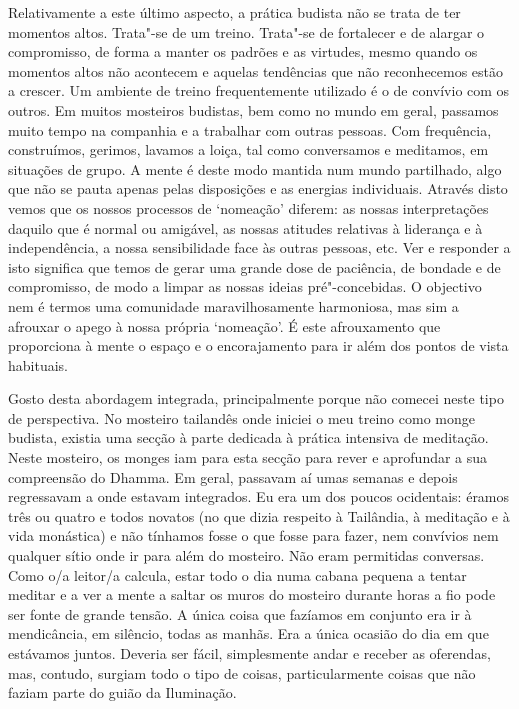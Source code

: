 Relativamente a este último aspecto, a prática budista não se trata de ter
momentos altos. Trata"-se de um treino. Trata"-se de fortalecer e de alargar o
compromisso, de forma a manter os padrões e as virtudes, mesmo quando os
momentos altos não acontecem e aquelas tendências que não reconhecemos estão a
crescer. Um ambiente de treino frequentemente utilizado é o de convívio com os
outros. Em muitos mosteiros budistas, bem como no mundo em geral, passamos muito
tempo na companhia e a trabalhar com outras pessoas. Com frequência,
construímos, gerimos, lavamos a loiça, tal como conversamos e meditamos, em
situações de grupo. A mente é deste modo mantida num mundo partilhado, algo que
não se pauta apenas pelas disposições e as energias individuais. Através disto
vemos que os nossos processos de `nomeação' diferem: as nossas interpretações
daquilo que é normal ou amigável, as nossas atitudes relativas à liderança e à
independência, a nossa sensibilidade face às outras pessoas, etc. Ver e
responder a isto significa que temos de gerar uma grande dose de paciência, de
bondade e de compromisso, de modo a limpar as nossas ideias pré"-concebidas. O
objectivo nem é termos uma comunidade maravilhosamente harmoniosa, mas sim a
afrouxar o apego à nossa própria `nomeação'. É este afrouxamento que proporciona
à mente o espaço e o encorajamento para ir além dos pontos de vista habituais.

Gosto desta abordagem integrada, principalmente porque não comecei neste tipo de
perspectiva. No mosteiro tailandês onde iniciei o meu treino como monge budista,
existia uma secção à parte dedicada à prática intensiva de meditação. Neste
mosteiro, os monges iam para esta secção para rever e aprofundar a sua
compreensão do Dhamma. Em geral, passavam aí umas semanas e depois regressavam a
onde estavam integrados. Eu era um dos poucos ocidentais: éramos três ou quatro
e todos novatos (no que dizia respeito à Tailândia, à meditação e à vida
monástica) e não tínhamos fosse o que fosse para fazer, nem convívios nem
qualquer sítio onde ir para além do mosteiro. Não eram permitidas conversas.
Como o/a leitor/a calcula, estar todo o dia numa cabana pequena a tentar meditar
e a ver a mente a saltar os muros do mosteiro durante horas a fio pode ser fonte
de grande tensão. A única coisa que fazíamos em conjunto era ir à mendicância,
em silêncio, todas as manhãs. Era a única ocasião do dia em que estávamos
juntos. Deveria ser fácil, simplesmente andar e receber as oferendas, mas,
contudo, surgiam todo o tipo de coisas, particularmente coisas que não faziam
parte do guião da Iluminação.


